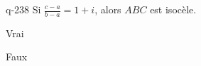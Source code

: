 \begin{truefalse}{q-238}
Si $\frac{c-a}{b-a} =1+i$, alors $ABC$ est isocèle.
\item* Vrai
\item Faux
\end{truefalse}

